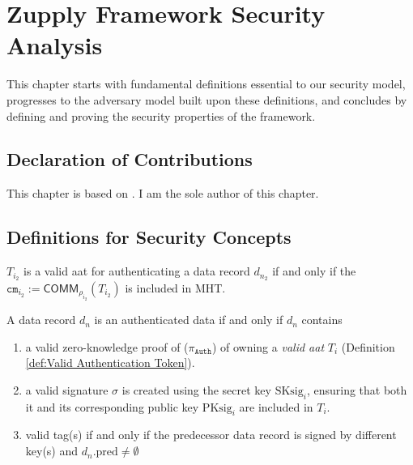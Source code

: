 \chapter{Zupply Framework Security Analysis}

This chapter starts with fundamental definitions essential to our security model, progresses to the adversary model built upon these definitions, and concludes by defining and proving the security properties of the framework.

\section*{Declaration of Contributions}
This chapter is based on \cite{Badakhshan2024Zupply}. I am the sole author of this chapter.



\section{Definitions for Security Concepts}

\begin{definition}
\label{def:Valid Authentication Token}
    $T_{i_2}$ is a valid \gls{aat} for authenticating a data record $d_{n_2}$ if and only if
    the $\texttt{cm}_{i_2} := \mathsf{COMM}_{\rho_{i_2}}(T_{i_2})$ is included in \textsf{MHT}.
\end{definition}


\begin{definition}
\label{def:Authenticated Data}
    A data record $d_{n}$ is an authenticated data if and only if $d_{n}$ contains
    \begin{enumerate}
        \item  a valid zero-knowledge proof of ($\pi_\texttt{Auth}$) of owning a \textit{valid \gls{aat}} $T_{i}$ (Definition \ref{def:Valid Authentication Token}).
        \item a valid signature $\sigma$ is created using the secret key $\text{SKsig}_{i}$, ensuring that both it and its corresponding public key $\text{PKsig}_{i}$ are included in $T_{i}$.
        \item valid tag(s) if and only if the predecessor data record is signed by different key(s) and $d_{n}.\text{pred} \neq \emptyset$
    \end{enumerate}
\end{definition}

